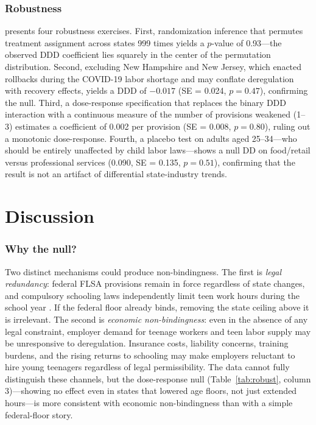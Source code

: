 \documentclass[12pt]{article}
\begin{document}
\subsubsection*{Robustness}  presents four robustness exercises. First, randomization inference that permutes treatment assignment across states 999 times yields a $p$-value of 0.93---the observed DDD coefficient lies squarely in the center of the permutation distribution. Second, excluding New Hampshire and New Jersey, which enacted rollbacks during the COVID-19 labor shortage and may conflate deregulation with recovery effects, yields a DDD of $-0.017$ (SE = 0.024, $p = 0.47$), confirming the null. Third, a dose-response specification that replaces the binary DDD interaction with a continuous measure of the number of provisions weakened (1--3) estimates a coefficient of 0.002 per provision (SE = 0.008, $p = 0.80$), ruling out a monotonic dose-response. Fourth, a placebo test on adults aged 25--34---who should be entirely unaffected by child labor laws---shows a null DD on food/retail versus professional services (0.090, SE = 0.135, $p = 0.51$), confirming that the result is not an artifact of differential state-industry trends.



\section{Discussion}\label{sec:discussion}

\subsubsection*{Why the null?} Two distinct mechanisms could produce non-bindingness. The first is \textit{legal redundancy}: federal FLSA provisions remain in force regardless of state changes, and compulsory schooling laws independently limit teen work hours during the school year \citep{lleras_muney2002}. If the federal floor already binds, removing the state ceiling above it is irrelevant. The second is \textit{economic non-bindingness}: even in the absence of any legal constraint, employer demand for teenage workers and teen labor supply may be unresponsive to deregulation. Insurance costs, liability concerns, training burdens, and the rising returns to schooling may make employers reluctant to hire young teenagers regardless of legal permissibility. The data cannot fully distinguish these channels, but the dose-response null (Table~\ref{tab:robust}, column 3)---showing no effect even in states that lowered age floors, not just extended hours---is more consistent with economic non-bindingness than with a simple federal-floor story.
\end{document}
